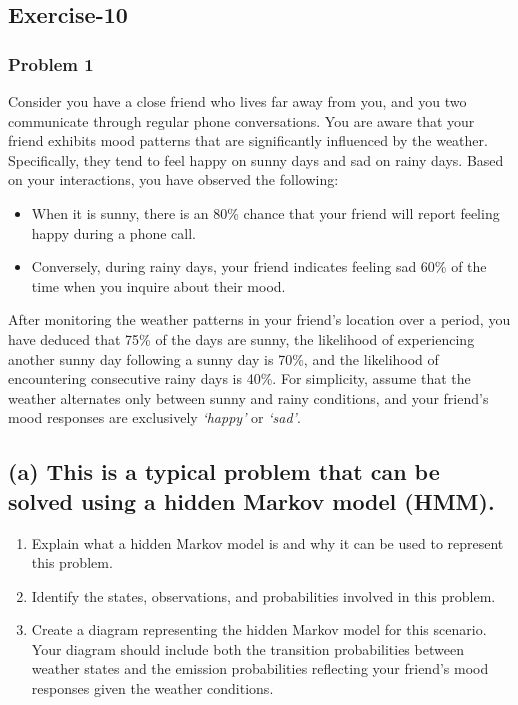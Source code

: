 \subsection{Exercise-10}
\subsubsection{Problem 1}

Consider you have a close friend who lives far away from you, and you two communicate through regular
phone conversations. You are aware that your friend exhibits mood patterns that are significantly influenced
by the weather. Specifically, they tend to feel happy on sunny days and sad on rainy days. Based on your
interactions, you have observed the following:

\begin{itemize}
  \item When it is sunny, there is an 80\% chance that your friend will report feeling happy during a phone call.
  \item Conversely, during rainy days, your friend indicates feeling sad 60\% of the time when you inquire about
        their mood.
\end{itemize}

After monitoring the weather patterns in your friend’s location over a period, you have deduced that 75\%
of the days are sunny, the likelihood of experiencing another sunny day following a sunny day is 70\%, and
the likelihood of encountering consecutive rainy days is 40\%. For simplicity, assume that the weather
alternates only between sunny and rainy conditions, and your friend’s mood responses are exclusively
\emph{‘happy’} or \emph{‘sad’}.

\subsection*{(a) This is a typical problem that can be solved using a hidden Markov model (HMM).}

\begin{enumerate}[label=(\roman*)]
\item Explain what a hidden Markov model is and why it can be used to represent this problem.

\item Identify the states, observations, and probabilities involved in this problem.

\item Create a diagram representing the hidden Markov model for this scenario. Your diagram should
      include both the transition probabilities between weather states and the emission probabilities
      reflecting your friend’s mood responses given the weather conditions.
\end{enumerate}


